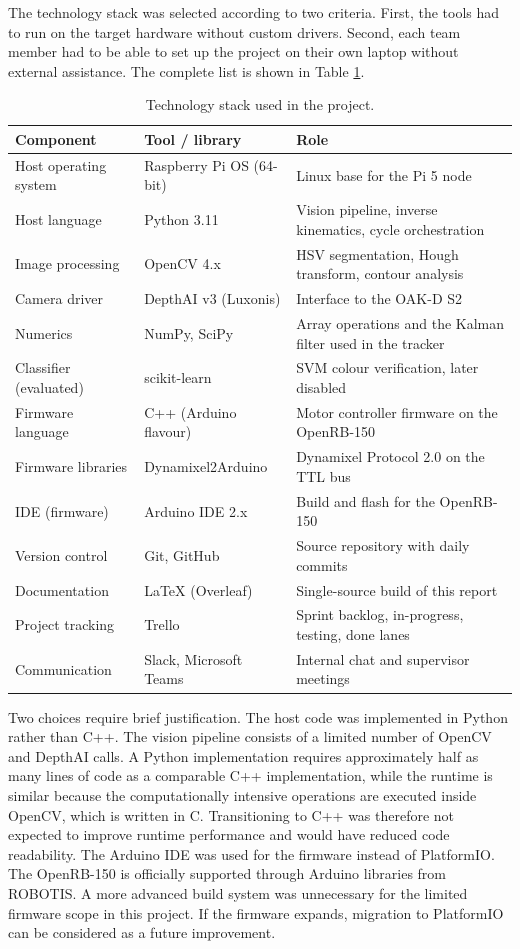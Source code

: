 \label{sec:technology-stack}
The technology stack was selected according to two criteria. First, the
tools had to run on the target hardware without custom drivers. Second,
each team member had to be able to set up the project on their own
laptop without external assistance.
The complete list is shown in Table \ref{tab:tech-stack}.
\begin{table}[h]
\centering
\small
\begin{tabular}{p{3.5cm} p{4cm} p{6.5cm}}
\toprule
\textbf{Component} & \textbf{Tool / library} & \textbf{Role} \\
\midrule
Host operating system & Raspberry Pi OS (64-bit) & Linux base for the Pi 5 node \\
Host language & Python 3.11 & Vision pipeline, inverse kinematics, cycle
orchestration \\
Image processing & OpenCV 4.x & HSV segmentation, Hough transform, contour analysis
\\
Camera driver & DepthAI v3 (Luxonis) & Interface to the OAK-D S2 \\
Numerics & NumPy, SciPy & Array operations and the Kalman filter used in the
tracker \\
Classifier (evaluated) & scikit-learn & SVM colour verification, later disabled \\
Firmware language & C++ (Arduino flavour) & Motor controller firmware on the
OpenRB-150 \\
Firmware libraries & Dynamixel2Arduino & Dynamixel Protocol 2.0 on the TTL bus \\
IDE (firmware) & Arduino IDE 2.x & Build and flash for the OpenRB-150 \\
Version control & Git, GitHub & Source repository with daily commits \\
Documentation & \LaTeX{} (Overleaf) & Single-source build of this report \\
Project tracking & Trello & Sprint backlog, in-progress, testing, done lanes \\
Communication & Slack, Microsoft Teams & Internal chat and supervisor meetings \\
\bottomrule
\end{tabular}
\caption{Technology stack used in the project.}
\label{tab:tech-stack}
\end{table}
Two choices require brief justification.
The host code was implemented in Python rather than C++. The vision
pipeline consists of a limited number of OpenCV and DepthAI calls. A
Python implementation requires approximately half as many lines of code
as a comparable C++ implementation, while the runtime is similar because
the computationally intensive operations are executed inside OpenCV,
which is written in C. Transitioning to C++ was therefore not expected to
improve runtime performance and would have reduced code readability.
The Arduino IDE was used for the firmware instead of PlatformIO. The
OpenRB-150 is officially supported through Arduino libraries from
ROBOTIS. A more advanced build system was unnecessary for the limited
firmware scope in this project. If the firmware expands, migration to
PlatformIO can be considered as a future improvement.
